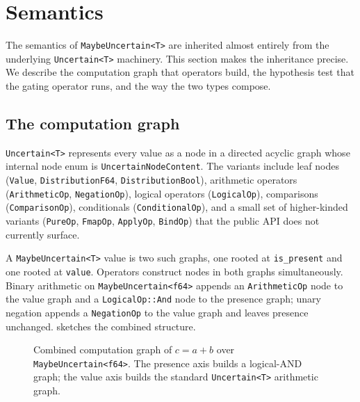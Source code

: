 \section{Semantics}
\label{sec:semantics}

The semantics of \texttt{MaybeUncertain<T>} are inherited almost entirely from
the underlying \texttt{Uncertain<T>} machinery. This section makes the
inheritance precise. We describe the computation graph that operators build,
the hypothesis test that the gating operator runs, and the way the two types
compose.

\subsection{The computation graph}
\label{sec:semantics:graph}

\texttt{Uncertain<T>} represents every value as a node in a directed acyclic
graph whose internal node enum is \texttt{UncertainNodeContent}. The variants
include leaf nodes (\texttt{Value}, \texttt{DistributionF64},
\texttt{DistributionBool}), arithmetic operators
(\texttt{ArithmeticOp}, \texttt{NegationOp}), logical operators
(\texttt{LogicalOp}), comparisons (\texttt{ComparisonOp}), conditionals
(\texttt{ConditionalOp}), and a small set of higher-kinded variants
(\texttt{PureOp}, \texttt{FmapOp}, \texttt{ApplyOp}, \texttt{BindOp}) that
the public API does not currently surface.

A \texttt{MaybeUncertain<T>} value is two such graphs, one rooted at
\texttt{is\_present} and one rooted at \texttt{value}. Operators construct
nodes in both graphs simultaneously. Binary arithmetic on
\texttt{MaybeUncertain<f64>} appends an \texttt{ArithmeticOp} node to the
value graph and a \texttt{LogicalOp::And} node to the presence graph; unary
negation appends a \texttt{NegationOp} to the value graph and leaves presence
unchanged.  sketches the combined structure.

\begin{figure}[h]
\centering
\caption{Combined computation graph of $c = a + b$ over
\texttt{MaybeUncertain<f64>}. The presence axis builds a logical-AND graph;
the value axis builds the standard \texttt{Uncertain<T>} arithmetic graph.}
\label{fig:graph}
\end{figure}

